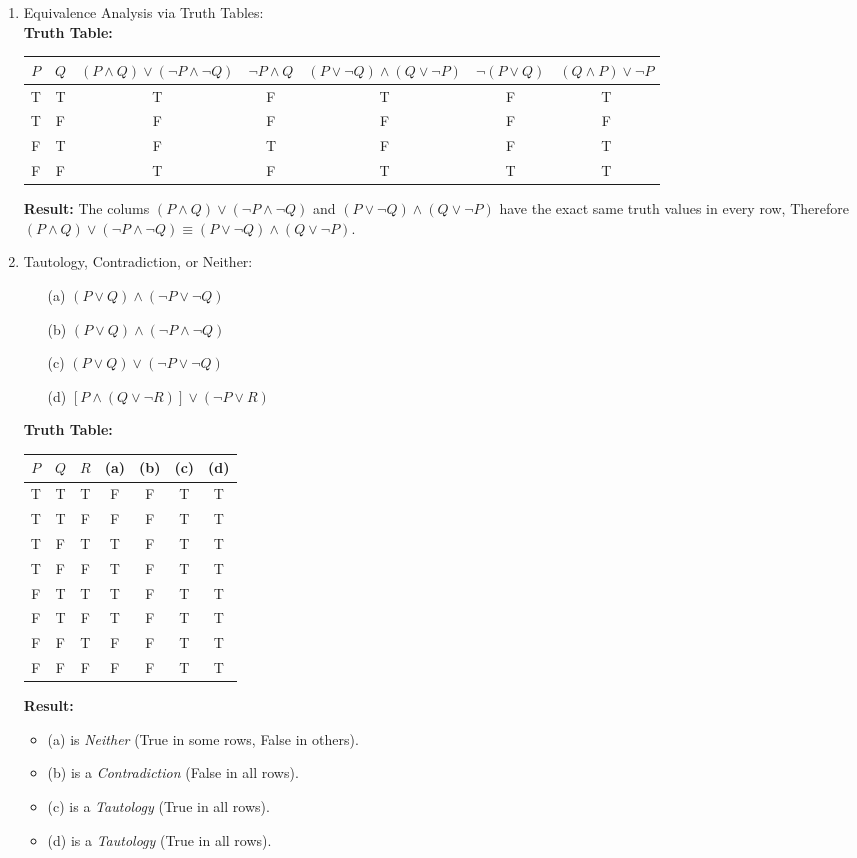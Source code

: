 \begin{enumerate}
\item Equivalence Analysis via Truth Tables: \\
  \textbf{Truth Table:}
  \begin{center}
    \begin{tabular}{ccccccc}
      $P$ & $Q$ & $(P \land Q) \lor (\neg P \land \neg Q)$ & $\neg P \land Q$ & $(P \lor \neg Q) \land (Q \lor \neg P)$ & $\neg (P \lor Q)$ & $(Q \land P) \lor \neg P$ \\
      \midrule
      T & T & T & F & T & F & T \\
      T & F & F & F & F & F & F \\
      F & T & F & T & F & F & T \\
      F & F & T & F & T & T & T 
    \end{tabular}
  \end{center}
  \textbf{Result:} The colums $(P \land Q) \lor (\neg P \land \neg Q)$ and $(P \lor \neg Q) \land (Q \lor \neg P)$ have the exact same truth values in every row, Therefore $(P \land Q) \lor (\neg P \land \neg Q) \equiv (P \lor \neg Q) \land (Q \lor \neg P)$.

\item Tautology, Contradiction, or Neither:
  \begin{enumerate}
  \item[(a)] $(P \lor Q) \land (\neg P \lor \neg Q)$
  \item[(b)] $(P \lor Q) \land (\neg P \land \neg Q)$
  \item[(c)] $(P \lor Q) \lor (\neg P \lor \neg Q)$
  \item[(d)] $[P \land (Q \lor \neg R)] \lor (\neg P \lor R)$
  \end{enumerate}
  \textbf{Truth Table:}
  \begin{center}
    \begin{tabular}{ccccccc}
      $P$ & $Q$ & $R$ & (a) & (b) & (c) & (d) \\
      \midrule
      T & T & T & F & F & T & T \\
      T & T & F & F & F & T & T \\
      T & F & T & T & F & T & T \\
      T & F & F & T & F & T & T \\
      F & T & T & T & F & T & T \\
      F & T & F & T & F & T & T \\
      F & F & T & F & F & T & T \\
      F & F & F & F & F & T & T
    \end{tabular}
  \end{center}
  \textbf{Result:}
  \begin{itemize}
  \item (a) is \emph{Neither} (True in some rows, False in others).
  \item (b) is a \emph{Contradiction} (False in all rows).
  \item (c) is a \emph{Tautology} (True in all rows).
  \item (d) is a \emph{Tautology} (True in all rows).
  \end{itemize}


\end{enumerate}
